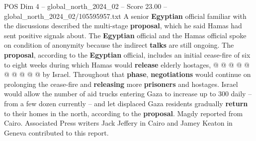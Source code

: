 \begin{textsample}{POS Dim 4 – global\_north\_2024\_02 – Score 23.00 – global\_north\_2024\_02/105595957.txt}
A senior \textbf{Egyptian} official familiar with the discussions described the multi-stage \textbf{proposal}, which he said Hamas had sent positive signals about.
The \textbf{Egyptian} official and the Hamas official spoke on condition of anonymity because the indirect \textbf{talks} are still ongoing.
The \textbf{proposal}, according to the \textbf{Egyptian} official, includes an initial cease-fire of six to eight weeks during which Hamas would \textbf{release} elderly hostages, @ @ @ @ @ @ @ @ @ @ by Israel.
Throughout that \textbf{phase}, \textbf{negotiations} would continue on prolonging the cease-fire and \textbf{releasing} more \textbf{prisoners} and hostages.
Israel would allow the number of aid trucks entering Gaza to increase up to 300 daily -- from a few dozen currently -- and let displaced Gaza residents gradually \textbf{return} to their homes in the north, according to the \textbf{proposal}.
Magdy reported from Cairo.
Associated Press writers Jack Jeffery in Cairo and Jamey Keaton in Geneva contributed to this report.

\end{textsample}
